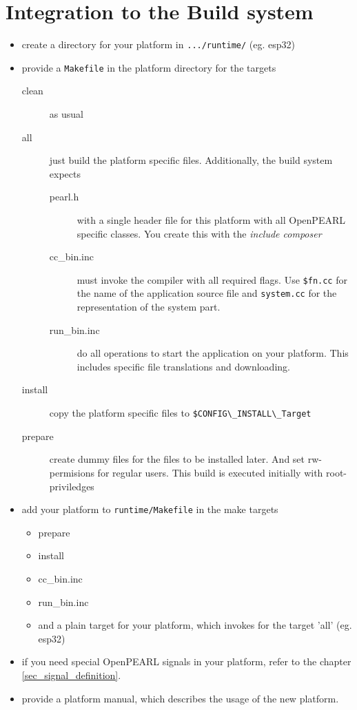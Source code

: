 \section{Integration to the Build system}
\begin{itemize}
\item create a directory for your platform in \verb|.../runtime/| (eg. esp32)
\item provide a \verb|Makefile| in the platform directory for the
   targets
  \begin{description}
  \item[clean] as usual 
  \item[all] just build the platform specific files. Additionally,
     the build system expects
     \begin{description}
        \item[pearl.h] with a single header file for this platform with 
         all OpenPEARL specific classes. You create this with the 
         \em{include composer}
       \item[cc\_bin.inc] must invoke the compiler with all required 
                flags. Use \verb|$fn.cc| for the name of the application
                source file and \verb|system.cc| for the representation
                of the system part.
       \item[run\_bin.inc] do all operations to start the application on
               your platform. This includes specific file translations and
               downloading.
     \end{description}
  \item[install] copy the platform specific files to 
	\verb|$CONFIG\_INSTALL\_Target|
  \item[prepare] create dummy files for the files to be installed later.
    And set rw-permisions for regular users. This build is executed 
    initially with root-priviledges
  \end{description}
\item add your platform to \verb|runtime/Makefile| in the make targets
   \begin{itemize}
   \item prepare
   \item install
   \item cc\_bin.inc
   \item run\_bin.inc
   \item and a plain target for your platform, which invokes for the target
      'all' (eg. esp32)
   \end{itemize}
\item if you need special OpenPEARL signals in your platform, refer to the 
   chapter \ref{sec_signal_definition}.
\item provide a platform manual, which describes the usage of the new platform.
\end{itemize}

